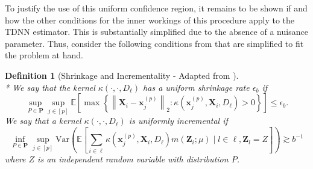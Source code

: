 \documentclass[letterpaper,10pt]{article}
\numberwithin{equation}{section}
\numberwithin{thm}{section}
\newtheorem{dfn}{Definition}
\numberwithin{lem}{section}
\numberwithin{cor}{section}
\newcommand{\E}{\mathbb{E}}
\newcommand{\1}{\mathbbm{1}}
\newcommand{\Var}{\text{Var}}
\begin{document}
To justify the use of this uniform confidence region, it remains to be shown if and how the other conditions for the inner workings of this procedure apply to the TDNN estimator.
This is substantially simplified due to the absence of a nuisance parameter.
Thus, consider the following conditions from \cite{ritzwoller_uniform_2024} that are simplified to fit the problem at hand.


\begin{dfn}[Shrinkage and Incrementality - Adapted from \citet{ritzwoller_uniform_2024}]\mbox{}\\*
	We say that the kernel $\kappa\left(\cdot, \cdot, D_{\ell}\right)$ has a uniform shrinkage rate $\epsilon_b$ if
	\begin{equation}
		\sup_{P \in \mathbf{P}} \sup_{j \in[p]}
		\E\left[\max \left\{\left\|\mathbf{X}_i-\mathbf{x}^{(p)}_{j}\right\|_{2}: \kappa\left(\mathbf{x}^{(p)}_{j}, \mathbf{X}_i, D_{\ell}\right)>0\right\}\right]
		\leq \epsilon_b .
	\end{equation}
	We say that a kernel $\kappa\left(\cdot, \cdot, D_{\ell}\right)$ is uniformly incremental if
	\begin{equation}
		\inf_{P \in \mathbf{P}} \sup_{j \in[p]}
		\Var\left(\E\left[\sum_{i \in \ell} \kappa\left(\mathbf{x}^{(p)}_{j}, \mathbf{X}_i, D_{\ell}\right) m\left(\mathbf{Z}_i ; \mu\right) \mid l \in \ell, \mathbf{Z}_l = Z\right]\right)
		\gtrsim b^{-1}
	\end{equation}
	where $Z$ is an independent random variable with distribution $P$.
\end{dfn}
\end{document}
